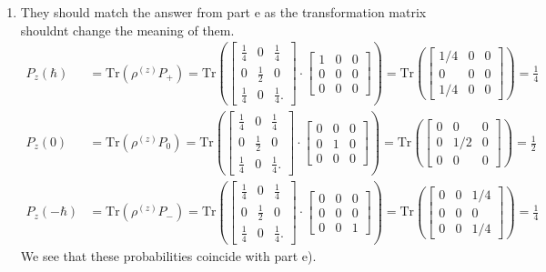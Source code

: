 \documentclass[letterpaper,11pt,twoside]{article}
\begin{document}
\begin{enumerate}[itemsep=0pt,topsep=0pt,label=\alph*)]
\begin{align*}
\begin{bmatrix}
    \end{bmatrix}\right)=0.
  \end{align*}
  \item They should match the answer from part e as the transformation matrix shouldnt change the meaning of them.
  \begin{align*}
    P_z(\hbar)&=\text{Tr}(\rho^{(z)}P_+)=\text{Tr}\left(\begin{bmatrix}
      \frac{1}{4}&0&\frac{1}{4}\\0&\frac{1}{2}&0\\\frac{1}{4}&0&\frac{1}{4}.
    \end{bmatrix}\cdot\begin{bmatrix}
      1&0&0\\0&0&0\\0&0&0
    \end{bmatrix}\right)=\text{Tr}\left(\begin{bmatrix}
      1/4&0&0\\0&0&0\\1/4&0&0
    \end{bmatrix}\right)=\frac{1}{4}\\
    P_z(0)&=\text{Tr}(\rho^{(z)}P_0)=\text{Tr}\left(\begin{bmatrix}
      \frac{1}{4}&0&\frac{1}{4}\\0&\frac{1}{2}&0\\\frac{1}{4}&0&\frac{1}{4}.
    \end{bmatrix}\cdot\begin{bmatrix}
      0&0&0\\0&1&0\\0&0&0
    \end{bmatrix}\right)=\text{Tr}\left(\begin{bmatrix}
      0&0&0\\0&1/2&0\\0&0&0
    \end{bmatrix}\right)=\frac{1}{2}\\
    P_z(-\hbar)&=\text{Tr}(\rho^{(z)}P_-)=\text{Tr}\left(\begin{bmatrix}
      \frac{1}{4}&0&\frac{1}{4}\\0&\frac{1}{2}&0\\\frac{1}{4}&0&\frac{1}{4}.
    \end{bmatrix}\cdot\begin{bmatrix}
      0&0&0\\0&0&0\\0&0&1
    \end{bmatrix}\right)=\text{Tr}\left(\begin{bmatrix}
      0&0&1/4\\0&0&0\\0&0&1/4
    \end{bmatrix}\right)=\frac{1}{4}
  \end{align*}
  We see that these probabilities coincide with part e).
\end{enumerate}
\end{document}
